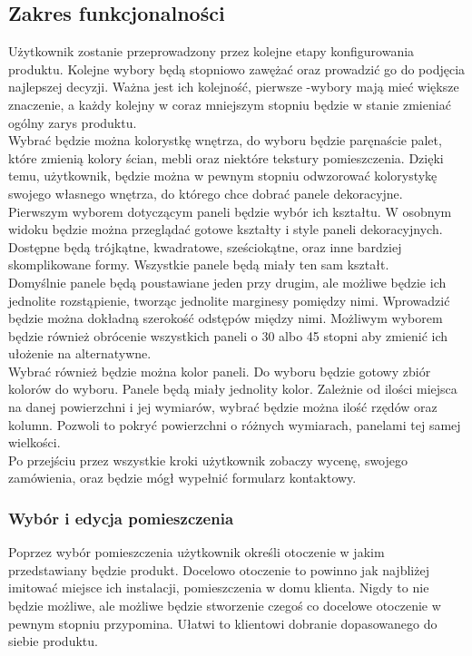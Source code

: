 \documentclass{article} %
\begin{document}
        
    \subsection{Zakres funkcjonalności}
        Użytkownik zostanie przeprowadzony przez kolejne etapy konfigurowania produktu. Kolejne wybory będą stopniowo zawężać oraz prowadzić go do podjęcia najlepszej decyzji. Ważna jest ich kolejność, pierwsze -wybory mają mieć większe znaczenie, a każdy kolejny w coraz mniejszym stopniu będzie w stanie zmieniać ogólny zarys produktu.
        \\
        
        Wybrać będzie można kolorystkę wnętrza, do wyboru będzie paręnaście palet, które zmienią kolory ścian, mebli oraz niektóre tekstury pomieszczenia. Dzięki temu, użytkownik, będzie można w pewnym stopniu odwzorować kolorystykę swojego własnego wnętrza, do którego chce dobrać panele dekoracyjne.
        \\
        
        Pierwszym wyborem dotyczącym paneli będzie wybór ich kształtu. W osobnym widoku będzie można przeglądać gotowe kształty i style paneli dekoracyjnych. Dostępne będą trójkątne, kwadratowe, sześciokątne, oraz inne bardziej skomplikowane formy. Wszystkie panele będą miały ten sam kształt.
        \\
        
        Domyślnie panele będą poustawiane jeden przy drugim, ale możliwe będzie ich jednolite rozstąpienie, tworząc jednolite marginesy pomiędzy nimi. Wprowadzić będzie można dokładną szerokość odstępów między nimi. Możliwym wyborem będzie również obrócenie wszystkich paneli o 30 albo 45 stopni aby zmienić ich ułożenie na alternatywne.
        \\
        
        Wybrać również będzie można kolor paneli. Do wyboru będzie gotowy zbiór kolorów do wyboru. Panele będą miały jednolity kolor. Zależnie od ilości miejsca na danej powierzchni i jej wymiarów, wybrać będzie można ilość rzędów oraz kolumn. Pozwoli to pokryć powierzchni o różnych wymiarach, panelami tej samej wielkości.
        \\
        
        Po przejściu przez wszystkie kroki użytkownik zobaczy wycenę, swojego zamówienia, oraz będzie mógł wypełnić formularz kontaktowy.
        \\
    
        \subsubsection{Wybór i edycja pomieszczenia}
        Poprzez wybór pomieszczenia użytkownik określi otoczenie w jakim przedstawiany będzie produkt. Docelowo otoczenie to powinno jak najbliżej imitować miejsce ich instalacji, pomieszczenia w domu klienta. Nigdy to nie będzie możliwe, ale możliwe będzie stworzenie czegoś co docelowe otoczenie w pewnym stopniu przypomina. Ułatwi to klientowi dobranie dopasowanego do siebie produktu.
        \\
        
\end{document}
